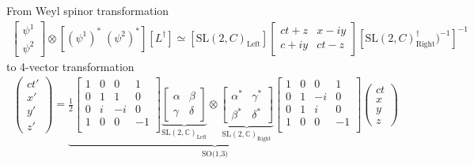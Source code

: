 \documentclass[../main.tex]{subfiles}
\begin{document}
\begin{itemize}
From Weyl spinor transformation
\begin{align}
[L]\left[\begin{matrix}
\psi^1\\ \psi^2
\end{matrix}\right]
\otimes[(\psi^1)^* \; (\psi^2)^*][L^\dagger]
\simeq
[\text{SL}(2,C)_\text{Left}]
\left[\begin{matrix}
ct+z & x-iy\\
c+iy & ct-z
\end{matrix}\right]
[\text{SL}(2,C)_\text{Right}^\dagger)^{-1}]^{-1}
\end{align}
to 4-vector transformation
\begin{align}
\left(\begin{matrix}
ct' \\x'\\y'\\z'
\end{matrix}\right)
=\underbrace{\frac{1}{2}
\left[\begin{matrix}
1&0&0&1\\
0&1&1&0\\
0&i&-i&0\\
1&0&0&-1\\
\end{matrix}\right]
\underbrace{\left[
\begin{matrix}\alpha&\beta\\ \gamma&\delta\end{matrix}
\right]}_{\text{SL}(2,\mathbb{C})_\text{Left}}
\otimes
\underbrace{\left[
\begin{matrix}\alpha^*&\gamma^*\\ \beta^*&\delta^*\end{matrix}
\right]}_{\text{SL}(2,\mathbb{C})_\text{Right}}
\left[\begin{matrix}
1&0&0&1\\
0&1&-i&0\\
0&1&i&0\\
1&0&0&-1\\
\end{matrix}\right]}_{\text{SO(1,3)}}
\left(\begin{matrix}
ct \\x\\y\\z
\end{matrix}\right)
\end{align}



\end{itemize}
\end{document}
